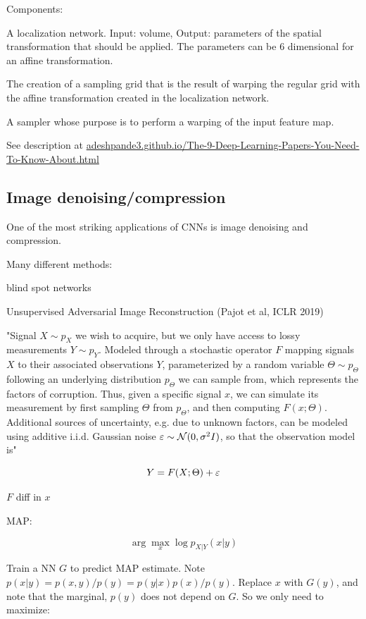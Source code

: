 \documentclass[english]{article}
\begin{document}
Components: 

A localization network. Input: volume, Output: parameters of the spatial transformation that should be applied. The parameters can be 6 dimensional for an affine transformation.

The creation of a sampling grid that is the result of warping the regular grid with the affine transformation created in the localization network.

A sampler whose purpose is to perform a warping of the input feature map.

See description at \url{adeshpande3.github.io/The-9-Deep-Learning-Papers-You-Need-To-Know-About.html}
\eenum 


\subsection{Image denoising/compression}
\benum
\item One of the most striking applications of CNNs is image denoising and compression. 

Many different methods:

blind spot networks

\item Unsupervised Adversarial Image Reconstruction (Pajot et al, ICLR 2019)

"Signal $X \sim p_X$ we wish to acquire, but we only have access to lossy measurements $Y \sim p_Y$. Modeled through a
stochastic operator $F$ mapping signals $X$ to their associated observations $Y$, parameterized by a random variable
$\Theta \sim p_\Theta$ following an underlying distribution $p_\Theta$ we can sample from, which represents the factors
of corruption. Thus, given a specific signal $x$, we can simulate its measurement by first sampling
$\Theta$ from $p_\Theta$, and then computing $F(x;\Theta)$. Additional sources of uncertainty, e.g. due to unknown
factors, can be modeled using additive i.i.d. Gaussian noise $\varepsilon \sim \mathcal{N}(0,\sigma^2I)$, so that the
observation model is"

$$Y = F(X;\Theta) + \varepsilon$$ 

$F$ diff in $x$

MAP: 

$$\arg\max_x \log p_{X|Y}(x|y)$$

Train a NN $G$ to predict MAP estimate. Note $p(x|y) = p(x,y)/p(y) = p(y|x)p(x)/p(y)$. Replace $x$ with $G(y)$, and note that the marginal, $p(y)$ does not depend on $G$. So we only need to maximize:
\end{document}
